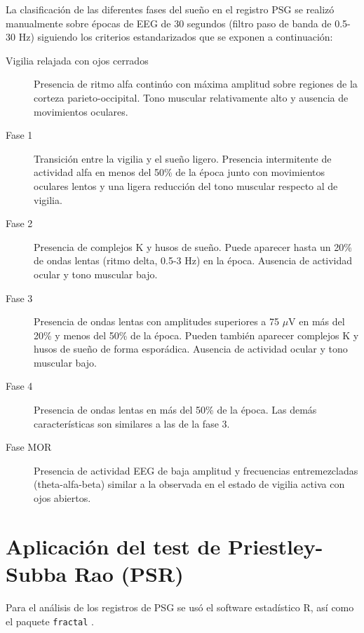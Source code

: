 La clasificaci\'on de las diferentes fases del sue\~no en el registro PSG se realiz\'o manualmente 
sobre \'epocas de EEG de 30 segundos (filtro paso de banda de 0.5-30 Hz) siguiendo los criterios 
estandarizados que se exponen a continuación\cite{Hori01}:
\begin{description}
\item[Vigilia relajada con ojos cerrados] Presencia de ritmo alfa contin\'uo con m\'axima amplitud 
sobre regiones de la corteza parieto-occipital. Tono muscular relativamente alto y ausencia de 
movimientos oculares.

\item[Fase 1] Transici\'on entre la vigilia y el sue\~no ligero. Presencia intermitente de 
actividad alfa en menos del 50\% de la \'epoca junto con movimientos oculares lentos y una ligera 
reducci\'on del tono muscular respecto al de vigilia.

\item[Fase 2] Presencia de complejos K y husos de sue\~no. Puede aparecer hasta un 20\% de ondas 
lentas (ritmo delta, 0.5-3 Hz) en la \'epoca. Ausencia de actividad ocular y tono muscular bajo.

\item[Fase 3] Presencia de ondas lentas con amplitudes superiores a 75 $\mu$V en m\'as del
20\% y menos del 50\% de la \'epoca. Pueden tambi\'en aparecer complejos K y husos de sue\~no de 
forma espor\'adica. Ausencia de actividad ocular y tono muscular bajo.

\item[Fase 4] Presencia de ondas lentas en m\'as del 50\% de la época. Las dem\'as 
caracter\'isticas son similares a las de la fase 3.

\item[Fase MOR] Presencia de actividad EEG de baja amplitud y frecuencias entremezcladas 
(theta-alfa-beta) similar a la observada en el estado de vigilia activa con ojos abiertos.
\end{description}


\section{Aplicaci\'on del test de Priestley-Subba Rao (PSR)}

Para el an\'alisis de los registros de PSG se us\'o el software estad\'istico R\cite{R_citar}, 
as\'i como el paquete \texttt{fractal} \cite{R_fractal}.

